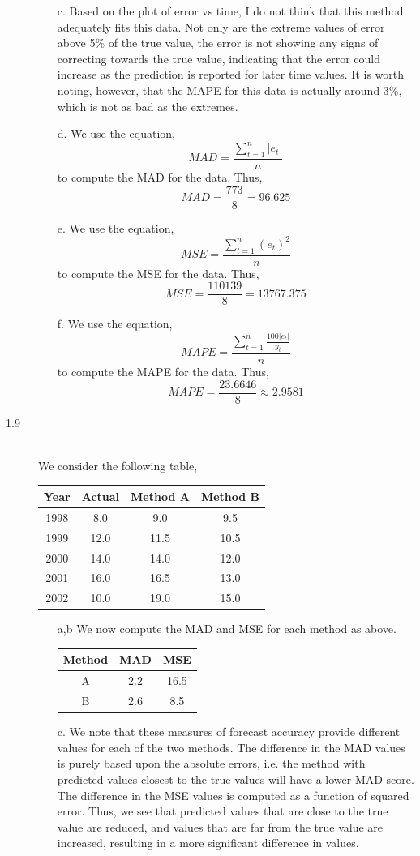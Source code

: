 \documentclass[letterpaper,10pt]{article}
\begin{document}
\begin{description}
\begin{enumerate}
\begin{center}
\end{center}
\item[c.] Based on the plot of error vs time, I do not think that this method adequately fits this data. Not only are the extreme values of error above 5\% of the true value, the error is not showing any signs of correcting towards the true value, indicating that the error could increase as the prediction is reported for later time values. It is worth noting, however, that the MAPE for this data is actually around 3\%, which is not as bad as the extremes.
\item[d.] We use the equation,
\[MAD=\frac{\sum_{t=1}^{n}|e_t|}{n}\]
to compute the MAD for the data. Thus,
\[MAD=\frac{773}{8}=96.625\]
\item[e.] We use the equation,
\[MSE=\frac{\sum_{t=1}^{n}(e_t)^2}{n}\]
to compute the MSE for the data. Thus,
\[MSE=\frac{110139}{8}=13767.375\]
\item[f.] We use the equation,
\[MAPE=\frac{\sum_{t=1}^{n}\frac{100|e_t|}{y_t}}{n}\]
to compute the MAPE for the data. Thus,
\[MAPE=\frac{23.6646}{8}\approx 2.9581\]
\end{enumerate}
\item[1.9]\hfill\\
We consider the following table,\\
\begin{center}
\begin{tabular}{cccc}
Year & Actual & Method A & Method B \\\hline
1998 & 8.0 & 9.0 & 9.5 \\
1999 & 12.0 & 11.5 & 10.5 \\
2000 & 14.0 & 14.0 & 12.0 \\
2001 & 16.0 & 16.5 & 13.0 \\
2002 & 10.0 & 19.0 & 15.0
\end{tabular}
\end{center}
\begin{enumerate}
\item[a,b] We now compute the MAD and MSE for each method as above.\\
\begin{center}
\begin{tabular}{ccc}
Method & MAD & MSE \\\hline
A & 2.2 & 16.5\\
B & 2.6 & 8.5
\end{tabular}
\end{center}
\item[c.] We note that these measures of forecast accuracy provide different values for each of the two methods. The difference in the MAD values is purely based upon the absolute errors, i.e. the method with predicted values closest to the true values will have a lower MAD score. The difference in the MSE values is computed as a function of squared error. Thus, we see that predicted values that are close to the true value are reduced, and values that are far from the true value are increased, resulting in a more significant difference in values.

\end{enumerate}
\end{description}
\end{document}
